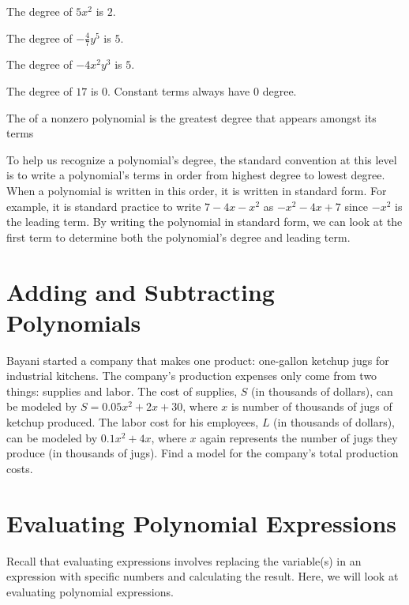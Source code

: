 \documentclass{ximera}
\begin{document}
\begin{example}
 \item The degree of $5x^2$ is $2$.
\item The degree of $-\frac{4}{7}y^5$ is $5$.
\item     The degree of $-4x^2y^3$ is $5$.
\item  The degree of $17$ is $0$. Constant terms always have $0$ degree.
\end{example}
\begin{definition}
   The  of a nonzero polynomial
          is the greatest degree that appears amongst its terms
\end{definition}
\begin{remark}
   To help us recognize a polynomial's degree,
        the standard convention at this level is to write a polynomial's terms in order from highest degree to lowest degree.
        When a polynomial is written in this order,
        it is written in standard form.
        For example,
        it is standard practice to write $7-4x-x^2$ as
        $-x^2-4x+7$ since $-x^2$ is the leading term.
        By writing the polynomial in standard form,
        we can look at the first term to determine both the polynomial's degree and leading term.
\end{remark}

\section{Adding and Subtracting Polynomials}
        Bayani started a company that makes one product: one-gallon ketchup jugs for industrial kitchens.
        The company's production expenses only come from two things:
        supplies and labor.
        The cost of supplies, $S$
        (in thousands of dollars),
        can be modeled by $S=0.05x^2+2x+30$,
        where $x$ is number of thousands of jugs of ketchup produced.
        The labor cost for his employees, $L$
        (in thousands of dollars),
        can be modeled by $0.1x^2+4x$,
        where $x$ again represents the number of jugs they produce
        (in thousands of jugs).
        Find a model for the company's total production costs.

\section{Evaluating Polynomial Expressions}

      Recall that evaluating expressions involves replacing the variable(s) in an expression with specific numbers and calculating the result.
      Here, we will look at evaluating polynomial expressions.
\end{document}

